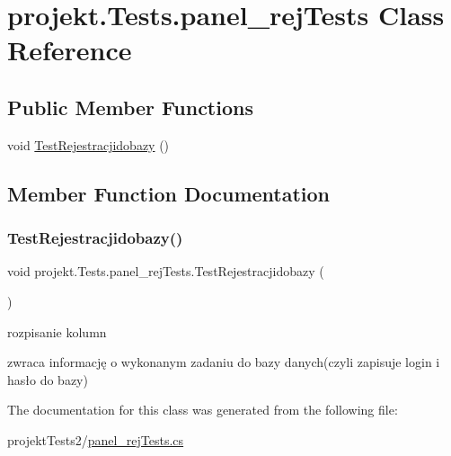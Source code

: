\hypertarget{classprojekt_1_1_tests_1_1panel__rej_tests}{}\section{projekt.\+Tests.\+panel\+\_\+rej\+Tests Class Reference}
\label{classprojekt_1_1_tests_1_1panel__rej_tests}
\subsection*{Public Member Functions}
\begin{DoxyCompactItemize}
\item 
void \mbox{\hyperlink{classprojekt_1_1_tests_1_1panel__rej_tests_acd26dd99e18d73015373885a53e41055}{Test\+Rejestracjidobazy}} ()
\end{DoxyCompactItemize}


\subsection{Member Function Documentation}
\mbox{\label{classprojekt_1_1_tests_1_1panel__rej_tests_acd26dd99e18d73015373885a53e41055}} 
\subsubsection{\texorpdfstring{Test\+Rejestracjidobazy()}{TestRejestracjidobazy()}}
{\footnotesize\ttfamily void projekt.\+Tests.\+panel\+\_\+rej\+Tests.\+Test\+Rejestracjidobazy (\begin{DoxyParamCaption}{ }\end{DoxyParamCaption})\hspace{0.3cm}{\ttfamily [inline]}}

rozpisanie kolumn

zwraca informację o wykonanym zadaniu do bazy danych(czyli zapisuje login i hasło do bazy) 

The documentation for this class was generated from the following file\+:\begin{DoxyCompactItemize}
\item 
projekt\+Tests2/\mbox{\hyperlink{panel__rej_tests_8cs}{panel\+\_\+rej\+Tests.\+cs}}\end{DoxyCompactItemize}
